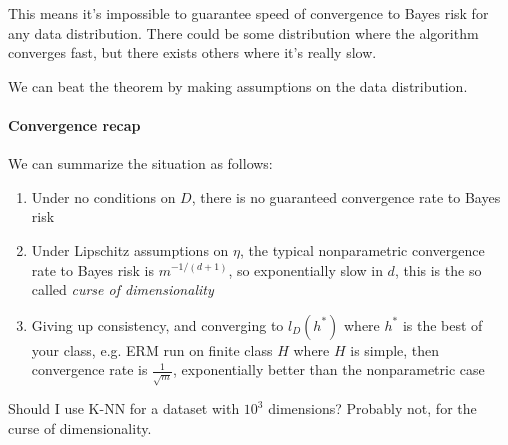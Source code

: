 This means it's impossible to guarantee speed of convergence to Bayes risk for 
any data distribution.
There could be some distribution where the algorithm converges fast, 
but there exists others where it's really slow.

\begin{remark}
    We can beat the theorem by making assumptions on the data distribution.
\end{remark}

\paragraph{Convergence recap}
We can summarize the situation as follows:
\begin{enumerate}
    \item Under no conditions on $D$, there is no guaranteed convergence 
    rate to Bayes risk
    \item Under Lipschitz assumptions on $\eta$, the typical 
    nonparametric convergence rate to Bayes risk is $m^{-1/(d+1)}$, so exponentially slow in $d$, 
    this is the so called \emph{curse of dimensionality}
    \item Giving up consistency, and converging to $l_D(h^*)$
    where $h^*$ is the best of your class, e.g. ERM run on finite class $H$
    where $H$ is simple, then convergence rate is $\frac{1}{\sqrt{m}}$, 
    exponentially better than the nonparametric case
\end{enumerate}

\begin{remark}
    Should I use K-NN for a dataset with $10^3$ dimensions? Probably not, 
    for the curse of dimensionality.
\end{remark}